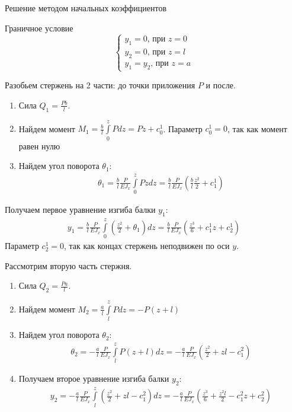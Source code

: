 \documentclass[ignoreonframetext,unicode]{beamer}
\begin{document}
	\begin{frame}{Решение методом начальных коэффициентов}
	
	\begin{block}{Граничное условие}
		\[
		\begin{cases}
			y_1 = 0 \mbox{, при } z = 0\\
			y_2 = 0 \mbox{, при } z = l\\
			y_1 = y_2 \mbox{, при } z = a
		\end{cases}
		\]		
	\end{block}
	Разобьем стержень на 2 части: до точки приложения $P$ и после.
	\begin{enumerate}
		\item  Сила $Q_1 = \frac{P b}{l} $.
		
		\item Найдем момент $M_1 = \frac{b}{l} \int\limits_0^z P d z = P z + c_0^1$. Параметр $c_0^1 = 0$, так как момент равен нулю
		
		\item Найдем угол поворота $\theta_1$:
		\begin{gather*}
				\theta_1 = \frac{b}{l} \frac{P}{E J_{x}} \int\limits_0^z P z d z = \frac{b}{l} \frac{P}{E J_{x}} (\frac{b}{l} \frac{z^2}{2} + c_1^1)
		\end{gather*}		
	\end{enumerate}
\end{frame}

\begin{frame}
	Получаем первое уравнение изгиба балки $y_1$:
	\begin{gather*}
		y_1 = \frac{b}{l} \frac{P}{E J_{x}} \int\limits_0^z (\frac{z^2}{2} + \theta_1) dz =  \frac{b}{l} \frac{P}{E J_{x}} (\frac{z^3}{6} + c_1^1 z + c_2^1)
	\end{gather*}
Параметр $c_2^1 = 0$, так как концах стержень неподвижен по оси $y$. 
\end{frame}

\begin{frame}
	Рассмотрим вторую часть стержня. 
	\begin{enumerate}
		\item Сила $Q_2 = \frac{P a}{l}$.
		
		\item Найдем момент $M_2 = \frac{a}{l} \int\limits_l^z P d z = -P(z + l)$
		
		\item Найдем угол поворота $\theta_2$:
		\begin{gather*}
			\theta_2 = - \frac{a}{l} \frac{P}{E J_{x}} \int\limits_l^z P(z + l) d z = - \frac{a}{l} \frac{P}{E J_{x}} (\frac{z^2}{2} + z l - c_1^2)
		\end{gather*}
		
		\item Получаем второе уравнение изгиба балки $y_2$: 
		\begin{gather*}
			y_2 =  - \frac{a}{l} \frac{P}{E J_{x}} \int\limits_l^z (\frac{z^2}{2} + z l - c_1^2) dz = - \frac{a}{l}  \frac{P}{E J_{x}} (\frac{z^3}{6} + \frac{z^2 l}{2} - c_1^2 z + c_2^2)
		\end{gather*}
	\end{enumerate}
\end{frame}
\end{document}
